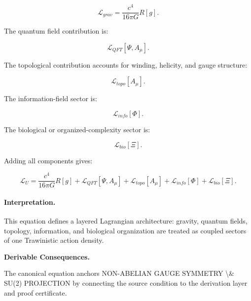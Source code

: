 \begin{equation}
\mathcal{L}_{grav}
=
\frac{c^4}{16\pi G}R[g].
\end{equation}

The quantum field contribution is:

\begin{equation}
\mathcal{L}_{QFT}[\Psi,A_\mu].
\end{equation}

The topological contribution accounts for winding, helicity, and gauge structure:

\begin{equation}
\mathcal{L}_{topo}[A_\mu].
\end{equation}

The information-field sector is:

\begin{equation}
\mathcal{L}_{info}[\Phi].
\end{equation}

The biological or organized-complexity sector is:

\begin{equation}
\mathcal{L}_{bio}[\Xi].
\end{equation}

Adding all components gives:

\begin{equation}
\boxed{
\mathcal{L}_U
=
\frac{c^4}{16\pi G}R[g]
+
\mathcal{L}_{QFT}[\Psi,A_\mu]
+
\mathcal{L}_{topo}[A_\mu]
+
\mathcal{L}_{info}[\Phi]
+
\mathcal{L}_{bio}[\Xi].
}
\end{equation}

\paragraph{Interpretation.}
This equation defines a layered Lagrangian architecture: gravity, quantum fields, topology, information, and biological organization are treated as coupled sectors of one Trawinistic action density.

\par\vspace{0.35em}
\noindent\textbf{Derivable Consequences.}\quad
\begingroup
\footnotesize
\raggedright
The canonical equation anchors NON-ABELIAN GAUGE SYMMETRY \textbackslash{}\& SU(2) PROJECTION by connecting the source condition to the derivation layer and proof certificate.
\par\endgroup

